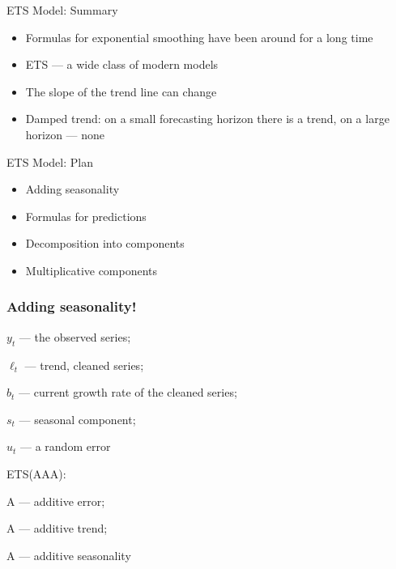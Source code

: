 \begin{frame}{ETS Model: Summary}
	
	\begin{itemize}[<+->]
		\item Formulas for \alert{exponential smoothing} have been around for a long time
		\item ETS — a wide class of modern models
		\item The slope of the trend line can change
		\item Damped trend: on a small forecasting horizon \alert{there is a trend}, on a large horizon — \alert{none}
		
	\end{itemize}
\end{frame}







\begin{frame} %
	
	
\end{frame}



\begin{frame}{ETS Model: Plan}
	\begin{itemize}[<+->]
		\item Adding seasonality
		\item Formulas for predictions
		\item Decomposition into components
		
		\item Multiplicative components
	\end{itemize}
	
\end{frame}









\begin{frame}
	\frametitle{Adding seasonality!}
	
	$y_t$ — the observed series;
	
	$\ell_t$ — trend, cleaned series;
	
	$b_t$ — current growth rate of the cleaned series;
	
	$s_t$ — seasonal component;
	
	$u_t$ — a random error
	
	\pause
	ETS(AAA):
	
	A — \alert{additive} error;
	
	A — \alert{additive} trend;
	
	A — \alert{additive} seasonality
	
\end{frame}


